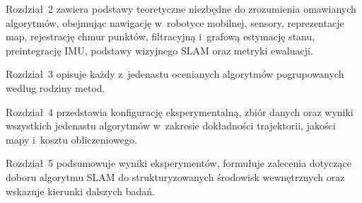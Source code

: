 Rozdział~2 zawiera podstawy teoretyczne niezbędne do zrozumienia omawianych
algorytmów, obejmując nawigację w~robotyce mobilnej, sensory, reprezentacje map,
rejestrację chmur punktów, filtracyjną i~grafową estymację stanu, preintegrację
IMU, podstawy wizyjnego SLAM oraz metryki ewaluacji.

Rozdział~3 opisuje każdy z~jedenastu ocenianych algorytmów pogrupowanych
według rodziny metod.

Rozdział~4 przedstawia konfigurację eksperymentalną, zbiór danych oraz wyniki
wszystkich jedenastu algorytmów w~zakresie dokładności trajektorii, jakości
mapy i~kosztu obliczeniowego.

Rozdział~5 podsumowuje wyniki eksperymentów, formułuje zalecenia dotyczące doboru
algorytmu SLAM do strukturyzowanych środowisk wewnętrznych oraz wskazuje kierunki
dalszych badań.

\endgroup
